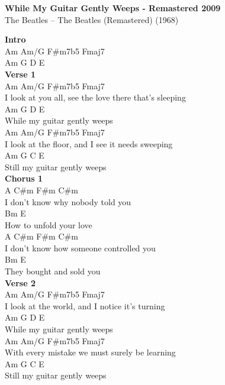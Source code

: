 \documentclass[a4paper]{article}
\begin{document}
    \begin{center}
        \textbf{While My Guitar Gently Weeps - Remastered 2009}
        ~\\
        The Beatles -- The Beatles (Remastered) (1968)
    \end{center}
    {
        \scriptsize
        \textbf{Intro}
        ~\\
        {
            \cutive
            \obeyspaces
Am Am/G F\#m7b5 Fmaj7
\\
Am G D E
\\

        }
        \textbf{Verse 1}
        ~\\
        {
            \cutive
            \obeyspaces
  Am          Am/G         F\#m7b5            Fmaj7
\\
I look at you all, see the love there that's sleeping
\\
Am            G          D     E
\\
  While my guitar gently weeps
\\
  Am          Am/G         F\#m7b5       Fmaj7
\\
I look at the floor, and I see it needs sweeping
\\
Am            G          C     E
\\
  Still my guitar gently weeps
\\

        }
        \textbf{Chorus 1}
        ~\\
        {
            \cutive
            \obeyspaces
A              C\#m  F\#m        C\#m      
\\
  I don't know why      nobody told you
\\
Bm                   E
\\
  How to unfold your love
\\
A              C\#m  F\#m            C\#m
\\
  I don't know how      someone controlled you
\\
Bm                     E
\\
  They bought and sold you
\\

        }
        \textbf{Verse 2}
        ~\\
        {
            \cutive
            \obeyspaces
  Am          Am/G         F\#m7b5      Fmaj7
\\
I look at the world, and I notice it's turning
\\
Am            G          D     E
\\
  While my guitar gently weeps
\\
     Am       Am/G         F\#m7b5    Fmaj7
\\
With every mistake we must surely be learning
\\
Am            G          C     E
\\
  Still my guitar gently weeps
\\

}}
\end{document}
